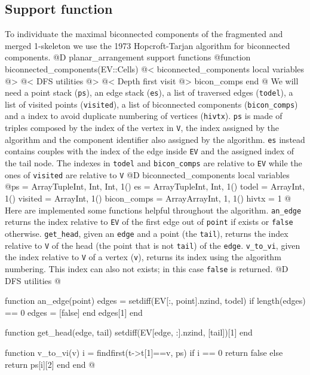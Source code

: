 \subsection{Support function}
\label{sec:biconnected_components}
To individuate the maximal biconnected components of the fragmented and merged 1-skeleton
we use the 1973 Hopcroft-Tarjan algorithm for biconnected components\cite{Hopcroft-Tarjan}.
@D planar\_arrangement support functions
@{function biconnected_components(EV::Cells)
    @< biconnected\_components local variables @>
    @< DFS utilities @>
    @< Depth first visit @>
    bicon_comps
end
@}
We will need a point stack (\texttt{ps}), an edge stack (\texttt{es}), a list of traversed edges (\texttt{todel}), a list of 
visited points (\texttt{visited}), a list of biconnected components (\texttt{bicon\_comps}) and a index to avoid duplicate 
numbering of vertices (\texttt{hivtx}). \texttt{ps} is made of triples composed by the index of the vertex in \texttt{V}, 
the index assigned by the algorithm and the component identifier also assigned by the algorithm. \texttt{es} instead 
contains couples with the index of the edge inside \texttt{EV} and the assigned index of the tail node. The indexes 
in \texttt{todel} and \texttt{bicon\_comps} are relative to \texttt{EV} while the ones of \texttt{visited} are
relative to \texttt{V}
@D biconnected\_components local variables
@{ps = Array{Tuple{Int, Int, Int}, 1}()
es = Array{Tuple{Int, Int}, 1}()
todel = Array{Int, 1}()
visited = Array{Int, 1}()
bicon_comps = Array{Array{Int, 1}, 1}()
hivtx = 1
@}
Here are implemented some functions helpful throughout the algorithm.
\texttt{an\_edge} returns the index relative to \texttt{EV} of the first edge out of \texttt{point} if exists or 
\texttt{false} otherwise. \texttt{get\_head}, given an \texttt{edge} and a point (the \texttt{tail}), returns the 
index relative to \texttt{V} of the head (the point that is not \texttt{tail}) of the \texttt{edge}. 
\texttt{v\_to\_vi}, given the index relative to \texttt{V} of a vertex (\texttt{v}), returns its index using 
the algorithm numbering. This index can also not exists; in this case \texttt{false} is returned.
@D DFS utilities
@{function an_edge(point)
    edges = setdiff(EV[:, point].nzind, todel)
    if length(edges) == 0
        edges = [false]
    end
    edges[1]
end

function get_head(edge, tail)
    setdiff(EV[edge, :].nzind, [tail])[1]
end

function v_to_vi(v)
    i = findfirst(t->t[1]==v, ps)
    if i == 0
        return false
    else
        return ps[i][2]
    end
end
@}

